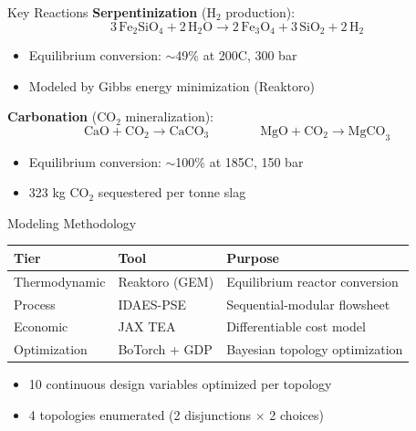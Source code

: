 \documentclass[aspectratio=169]{beamer}
\begin{document}
\begin{frame}{Key Reactions}
\textbf{Serpentinization} (H$_2$ production):
\begin{equation*}
3\,\text{Fe}_2\text{SiO}_4 + 2\,\text{H}_2\text{O}
\longrightarrow 2\,\text{Fe}_3\text{O}_4 + 3\,\text{SiO}_2 + 2\,\text{H}_2
\end{equation*}
\begin{itemize}
  \item Equilibrium conversion: $\sim$49\% at 200\textdegree C, 300 bar
  \item Modeled by Gibbs energy minimization (Reaktoro)
\end{itemize}

\vspace{10pt}
\textbf{Carbonation} (CO$_2$ mineralization):
\begin{equation*}
\text{CaO} + \text{CO}_2 \rightarrow \text{CaCO}_3
\qquad\qquad
\text{MgO} + \text{CO}_2 \rightarrow \text{MgCO}_3
\end{equation*}
\begin{itemize}
  \item Equilibrium conversion: $\sim$100\% at 185\textdegree C, 150 bar
  \item 323 kg CO$_2$ sequestered per tonne slag
\end{itemize}
\end{frame}

\begin{frame}{Modeling Methodology}
\centering
\begin{tabular}{@{}lll@{}}
\toprule
\textbf{Tier} & \textbf{Tool} & \textbf{Purpose} \\
\midrule
Thermodynamic & Reaktoro (GEM) & Equilibrium reactor conversion \\
Process & IDAES-PSE & Sequential-modular flowsheet \\
Economic & JAX TEA & Differentiable cost model \\
Optimization & BoTorch + GDP & Bayesian topology optimization \\
\bottomrule
\end{tabular}

\vspace{12pt}
\begin{itemize}
  \item 10 continuous design variables optimized per topology
  \item 4 topologies enumerated (2 disjunctions $\times$ 2 choices)
\end{itemize}
\end{frame}
\end{document}
